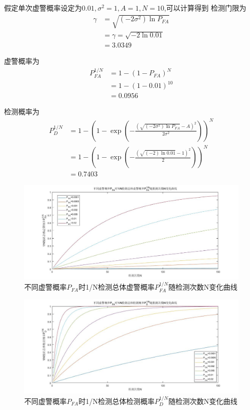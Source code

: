 \documentclass[fontset=windows]{article}
\numberwithin{figure}{section}
\begin{document}
假定单次虚警概率设定为\(0.01,\sigma^2=1,A=1,N=10\),可以计算得到
检测门限为
\begin{align*}
    \gamma & =\sqrt{(-2\sigma^2)\ln P_{FA}} \\
           & =\gamma=\sqrt{-2\ln 0.01}      \\
           & =3.0349
\end{align*}

虚警概率为
\begin{align*}
    P^{1/N}_{FA} & =1-(1-P_{FA})^N  \\
                 & =1-(1-0.01)^{10} \\
                 & =0.0956
\end{align*}

检测概率为
\begin{align*}
    P^{1/N}_D & =1-\left(1-\exp\left(-\frac{(\sqrt{(-2\sigma^2)\ln P_{FA}}-A)^2}{2\sigma^2}\right)\right)^N \\
              & =1-\left(1-\exp\left(-\frac{(\sqrt{(-2)\ln 0.01}-1)^2}{2}\right)\right)^N                   \\
              & =0.7403
\end{align*}

\begin{figure}[H]
    \centering
    \includegraphics[scale=0.35]{fig2_1.jpg}
    \caption{不同虚警概率\(P_{FA}\)时1/N检测总体虚警概率\(P^{1/N}_{FA}\)随检测次数N变化曲线}
    \label{2.1}
\end{figure}

\begin{figure}[H]
    \centering
    \includegraphics[scale=0.35]{fig2_2.jpg}
    \caption{不同虚警概率\(P_{FA}\)时1/N检测总体检测概率\(P^{1/N}_D\)随检测次数N变化曲线}
    \label{2.2}
\end{figure}
\end{document}
